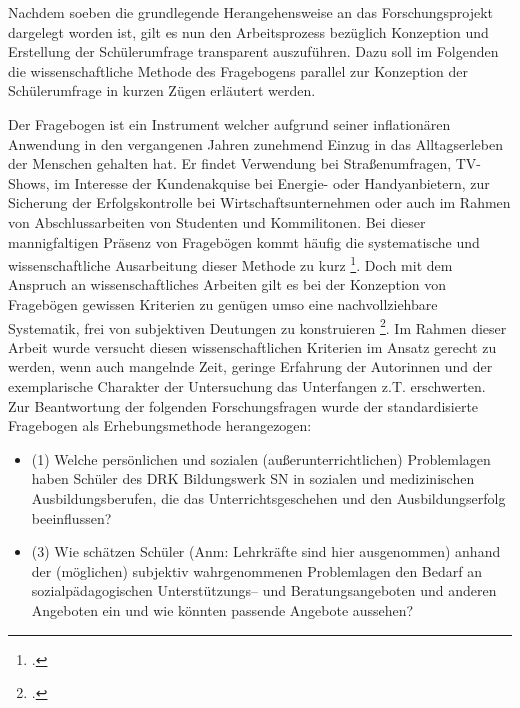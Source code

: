 Nachdem soeben die grundlegende Herangehensweise an das Forschungsprojekt dargelegt worden ist, gilt es nun den Arbeitsprozess bezüglich Konzeption und Erstellung der Schülerumfrage transparent auszuführen. Dazu soll im Folgenden die wissenschaftliche Methode des Fragebogens parallel zur Konzeption der Schülerumfrage in kurzen Zügen erläutert werden.

Der Fragebogen ist ein Instrument welcher aufgrund seiner inflationären Anwendung in den vergangenen Jahren zunehmend Einzug in das Alltagserleben der Menschen gehalten hat. Er findet Verwendung bei Straßenumfragen, TV-Shows, im Interesse der Kundenakquise bei Energie- oder Handyanbietern, zur Sicherung der Erfolgskontrolle bei Wirtschaftsunternehmen oder auch im Rahmen von Abschlussarbeiten von Studenten und Kommilitonen. Bei dieser mannigfaltigen Präsenz von Fragebögen kommt häufig die systematische und wissenschaftliche Ausarbeitung dieser Methode zu kurz \footcite[vgl.][11]{Kallus2010}. Doch mit dem Anspruch an wissenschaftliches Arbeiten gilt es bei der Konzeption von Fragebögen gewissen Kriterien zu genügen umso eine nachvollziehbare Systematik, frei von subjektiven Deutungen zu konstruieren \footcite[vgl.][9]{Mayer2013}. Im Rahmen dieser Arbeit wurde versucht diesen wissenschaftlichen Kriterien im Ansatz gerecht zu werden, wenn auch mangelnde Zeit, geringe Erfahrung der Autorinnen und der exemplarische Charakter der Untersuchung das Unterfangen z.T. erschwerten. Zur Beantwortung der folgenden Forschungsfragen wurde der standardisierte Fragebogen als Erhebungsmethode herangezogen:
 
 \begin{itemize}
	 \item (1) Welche persönlichen und sozialen (außerunterrichtlichen) Problemlagen haben Schüler des DRK Bildungswerk SN in sozialen und medizinischen Ausbildungsberufen, die das Unterrichtsgeschehen und den Ausbildungserfolg beeinflussen?
	\item (3) Wie schätzen Schüler (Anm: Lehrkräfte sind hier ausgenommen) anhand der (möglichen) subjektiv wahrgenommenen Problemlagen den Bedarf an sozialpädagogischen Unterstützungs-- und Beratungsangeboten und anderen Angeboten ein und wie könnten passende Angebote aussehen?
 \end{itemize}

